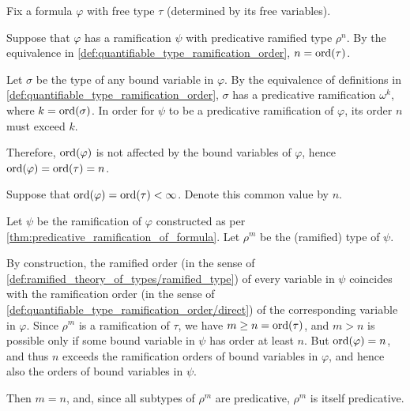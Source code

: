 \begin{defproof}
  Fix a formula \( \varphi \) with free type \( \tau \) (determined by its free variables).

   Suppose that \( \varphi \) has a ramification \( \psi \) with predicative ramified type \( \rho^n \). By the equivalence in \cref{def:quantifiable_type_ramification_order}, \( n = \operatorname{ord}(\tau) \).

  Let \( \sigma \) be the type of any bound variable in \( \varphi \). By the equivalence of definitions in \cref{def:quantifiable_type_ramification_order}, \( \sigma \) has a predicative ramification \( \omega^k \), where \( k = \operatorname{ord}(\sigma) \). In order for \( \psi \) to be a predicative ramification of \( \varphi \), its order \( n \) must exceed \( k \).

  Therefore, \( \operatorname{ord}(\varphi) \) is not affected by the bound variables of \( \varphi \), hence \( \operatorname{ord}(\varphi) = \operatorname{ord}(\tau) = n \).

   Suppose that \( \operatorname{ord}(\varphi) = \operatorname{ord}(\tau) < \infty \). Denote this common value by \( n \).

  Let \( \psi \) be the ramification of \( \varphi \) constructed as per \cref{thm:predicative_ramification_of_formula}. Let \( \rho^m \) be the (ramified) type of \( \psi \).

  By construction, the ramified order (in the sense of \cref{def:ramified_theory_of_types/ramified_type}) of every variable in \( \psi \) coincides with the ramification order (in the sense of \ref{def:quantifiable_type_ramification_order/direct}) of the corresponding variable in \( \varphi \). Since \( \rho^m \) is a ramification of \( \tau \), we have \( m \geq n = \operatorname{ord}(\tau) \), and \( m > n \) is possible only if some bound variable in \( \psi \) has order at least \( n \). But \( \operatorname{ord}(\varphi) = n \), and thus \( n \) exceeds the ramification orders of bound variables in \( \varphi \), and hence also the orders of bound variables in \( \psi \).

  Then \( m = n \), and, since all subtypes of \( \rho^m \) are predicative, \( \rho^m \) is itself predicative.
\end{defproof}

